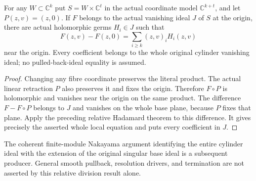 \begin{corollary}
\label{hir:actual-singular-cylinder-relative-difference}
\leanok
For any $W\subset\mathbb C^k$ put $S=W\times\mathbb C^t$ in the actual
coordinate model $\mathbb C^{k+t}$, and let $P(z,v)=(z,0)$. If $F$ belongs
to the actual vanishing ideal $J$ of $S$ at the origin, there are actual
holomorphic germs $H_i\in J$ such that
\[
 F(z,v)-F(z,0)=\sum_{i\ge k}(z,v)_iH_i(z,v)
\]
near the origin. Every coefficient belongs to the whole original cylinder
vanishing ideal; no pulled-back-ideal equality is assumed.
\end{corollary}
\begin{proof}
Changing any fibre coordinate preserves the literal product. The actual
linear retraction $P$ also preserves it and fixes the origin. Therefore
$F\circ P$ is holomorphic and vanishes near the origin on the same
product. The difference $F-F\circ P$ belongs to $J$ and vanishes on the
whole base plane, because $P$ fixes that plane. Apply the preceding
relative Hadamard theorem to this difference. It gives precisely the
asserted whole local equation and puts every coefficient in $J$.
\end{proof}

The coherent finite-module Nakayama argument identifying the entire cylinder
ideal with the extension of the original singular base ideal is a subsequent
producer. General smooth pullback, resolution drivers, and termination are
not asserted by this relative division result alone.
